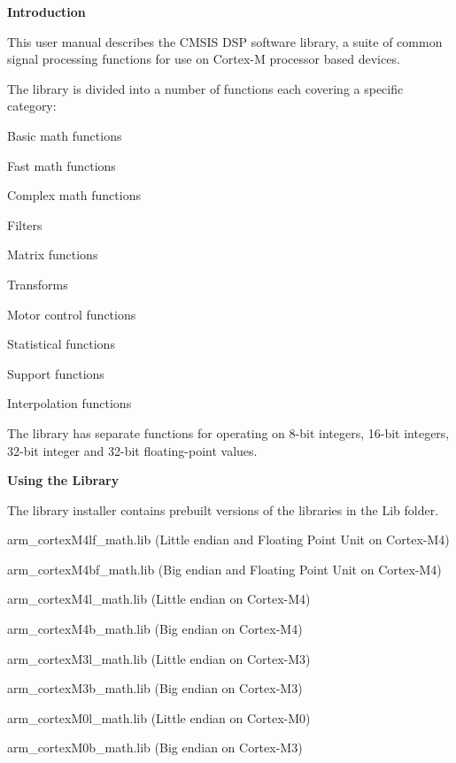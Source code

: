 {\bfseries Introduction}

This user manual describes the C\+M\+S\+IS D\+SP software library, a suite of common signal processing functions for use on Cortex-\/M processor based devices.

The library is divided into a number of functions each covering a specific category\+:
\begin{DoxyItemize}
\item Basic math functions
\item Fast math functions
\item Complex math functions
\item Filters
\item Matrix functions
\item Transforms
\item Motor control functions
\item Statistical functions
\item Support functions
\item Interpolation functions
\end{DoxyItemize}

The library has separate functions for operating on 8-\/bit integers, 16-\/bit integers, 32-\/bit integer and 32-\/bit floating-\/point values.

{\bfseries Using the Library}

The library installer contains prebuilt versions of the libraries in the {\ttfamily Lib} folder.
\begin{DoxyItemize}
\item arm\+\_\+cortex\+M4lf\+\_\+math.\+lib (Little endian and Floating Point Unit on Cortex-\/\+M4)
\item arm\+\_\+cortex\+M4bf\+\_\+math.\+lib (Big endian and Floating Point Unit on Cortex-\/\+M4)
\item arm\+\_\+cortex\+M4l\+\_\+math.\+lib (Little endian on Cortex-\/\+M4)
\item arm\+\_\+cortex\+M4b\+\_\+math.\+lib (Big endian on Cortex-\/\+M4)
\item arm\+\_\+cortex\+M3l\+\_\+math.\+lib (Little endian on Cortex-\/\+M3)
\item arm\+\_\+cortex\+M3b\+\_\+math.\+lib (Big endian on Cortex-\/\+M3)
\item arm\+\_\+cortex\+M0l\+\_\+math.\+lib (Little endian on Cortex-\/\+M0)
\item arm\+\_\+cortex\+M0b\+\_\+math.\+lib (Big endian on Cortex-\/\+M3)
\end{DoxyItemize}

